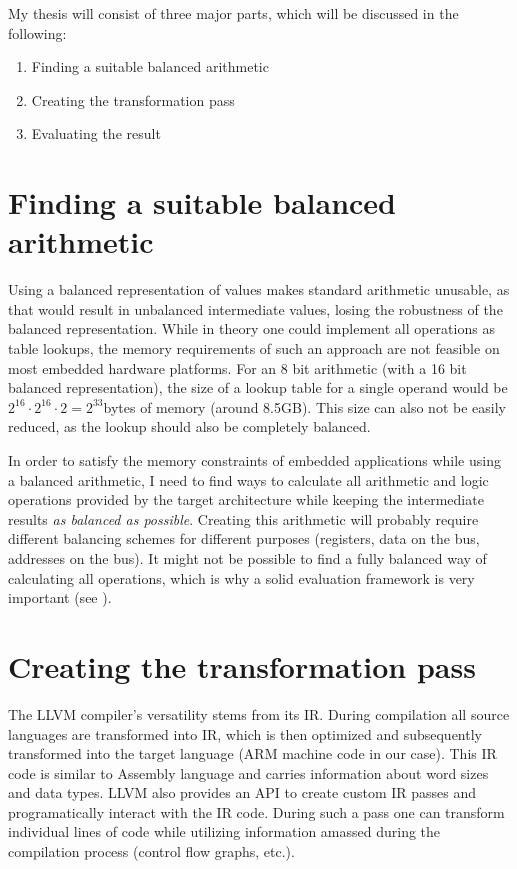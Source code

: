 \documentclass{article}
\begin{document}
My thesis will consist of three major parts, which will be discussed in the following:
\begin{enumerate}
\item Finding a suitable balanced arithmetic
\item Creating the transformation pass
\item Evaluating the result
\end{enumerate}


\section{Finding a suitable balanced arithmetic}
Using a balanced representation of values makes standard arithmetic unusable, as that would result in unbalanced intermediate values, losing the robustness of the balanced representation.
While in theory one could implement all operations as table lookups, the memory requirements of such an approach are not feasible on most embedded hardware platforms.
For an 8 bit arithmetic (with a 16 bit balanced representation), the size of a lookup table for a single operand would be $2^{16} \cdot 2^{16} \cdot 2 = 2^{33}$bytes of memory (around 8.5GB).
This size can also not be easily reduced, as the lookup should also be completely balanced.

In order to satisfy the memory constraints of embedded applications while using a balanced arithmetic, I need to find ways to calculate all arithmetic and logic operations provided by the target architecture while keeping the intermediate results \emph{as balanced as possible}.
Creating this arithmetic will probably require different balancing schemes for different purposes (registers, data on the bus, addresses on the bus).
It might not be possible to find a fully balanced way of calculating all operations, which is why a solid evaluation framework is very important (see ).

\section{Creating the transformation pass}
The LLVM compiler's versatility stems from its IR.
During compilation all source languages are transformed into IR, which is then optimized and subsequently transformed into the target language (ARM machine code in our case).
This IR code is similar to Assembly language and carries information about word sizes and data types.
LLVM also provides an API to create custom IR passes and programatically interact with the IR code.
During such a pass one can transform individual lines of code while utilizing information amassed during the compilation process (control flow graphs, etc.).
\end{document}
